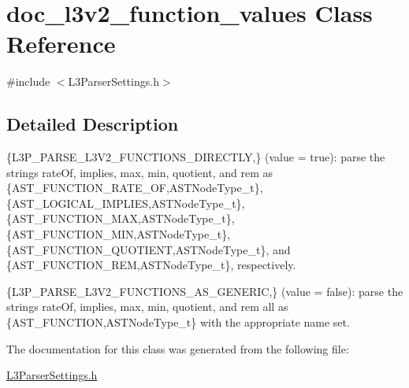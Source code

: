 \hypertarget{classdoc__l3v2__function__values}{}\section{doc\+\_\+l3v2\+\_\+function\+\_\+values Class Reference}
\label{classdoc__l3v2__function__values}


{\ttfamily \#include $<$L3\+Parser\+Settings.\+h$>$}



\subsection{Detailed Description}

\begin{DoxyItemize}
\item \{L3\+P\+\_\+\+P\+A\+R\+S\+E\+\_\+\+L3\+V2\+\_\+\+F\+U\+N\+C\+T\+I\+O\+N\+S\+\_\+\+D\+I\+R\+E\+C\+T\+LY,\} (value = {\ttfamily true})\+: parse the strings \textquotesingle{}rate\+Of\textquotesingle{}, \textquotesingle{}implies\textquotesingle{}, \textquotesingle{}max\textquotesingle{}, \textquotesingle{}min\textquotesingle{}, \textquotesingle{}quotient\textquotesingle{}, and \textquotesingle{}rem\textquotesingle{} as \{A\+S\+T\+\_\+\+F\+U\+N\+C\+T\+I\+O\+N\+\_\+\+R\+A\+T\+E\+\_\+\+OF,A\+S\+T\+Node\+Type\+\_\+t\}, \{A\+S\+T\+\_\+\+L\+O\+G\+I\+C\+A\+L\+\_\+\+I\+M\+P\+L\+I\+ES,A\+S\+T\+Node\+Type\+\_\+t\}, \{A\+S\+T\+\_\+\+F\+U\+N\+C\+T\+I\+O\+N\+\_\+\+M\+AX,A\+S\+T\+Node\+Type\+\_\+t\}, \{A\+S\+T\+\_\+\+F\+U\+N\+C\+T\+I\+O\+N\+\_\+\+M\+IN,A\+S\+T\+Node\+Type\+\_\+t\}, \{A\+S\+T\+\_\+\+F\+U\+N\+C\+T\+I\+O\+N\+\_\+\+Q\+U\+O\+T\+I\+E\+NT,A\+S\+T\+Node\+Type\+\_\+t\}, and \{A\+S\+T\+\_\+\+F\+U\+N\+C\+T\+I\+O\+N\+\_\+\+R\+EM,A\+S\+T\+Node\+Type\+\_\+t\}, respectively. 
\item \{L3\+P\+\_\+\+P\+A\+R\+S\+E\+\_\+\+L3\+V2\+\_\+\+F\+U\+N\+C\+T\+I\+O\+N\+S\+\_\+\+A\+S\+\_\+\+G\+E\+N\+E\+R\+IC,\} (value = {\ttfamily false})\+: parse the strings \textquotesingle{}rate\+Of\textquotesingle{}, \textquotesingle{}implies\textquotesingle{}, \textquotesingle{}max\textquotesingle{}, \textquotesingle{}min\textquotesingle{}, \textquotesingle{}quotient\textquotesingle{}, and \textquotesingle{}rem\textquotesingle{} all as \{A\+S\+T\+\_\+\+F\+U\+N\+C\+T\+I\+ON,A\+S\+T\+Node\+Type\+\_\+t\} with the appropriate name set. 
\end{DoxyItemize}

The documentation for this class was generated from the following file\+:\begin{DoxyCompactItemize}
\item 
\hyperlink{_l3_parser_settings_8h}{L3\+Parser\+Settings.\+h}\end{DoxyCompactItemize}
